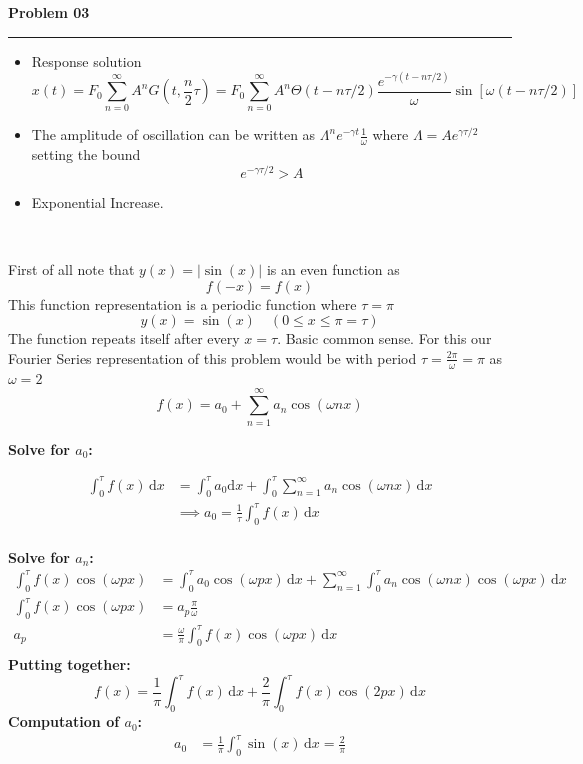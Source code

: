 \documentclass[letterpaper]{article}
\begin{document}
\vspace{0.4cm}
\textbf{Problem 03} \\
\noindent\rule{\textwidth}{0.2pt} 
\begin{itemize} 
	\item Response solution \[
 x(t) = F_0 \sum_{n=0}^{\infty} A^{n} G\left(t, \frac{n}{2} \tau\right)  
=  F_0 \sum_{n=0}^{\infty} 
A^{n}
\Theta(t - n \tau / 2 ) 
\frac{e^{- \gamma (t- n \tau / 2)}}{\omega}  
\sin\left[\omega (t- n \tau / 2 )\right]
\] 
\item The amplitude of oscillation can be written as $\Lambda^{n} e^{- \gamma t} \frac{1}{\omega}$ where $\Lambda = A e^{\gamma \tau / 2}$ setting the bound 
	\[
	e^{- \gamma \tau / 2} > A 
	\] 
\item Exponential Increase. 
\end{itemize}
\newpage
\ 

{}
\vspace{0.7cm} 

First of all note that $y(x) = | \sin(x) | $ is an even function as
\[
f(-x) = f(x)
\] This function representation is a periodic function where $\tau = \pi$
\[
y(x) = \sin(x) \quad (0 \le x \le \pi = \tau)
\]
The function repeats itself after every $x = \tau$. Basic common sense. 
For this our Fourier Series representation of this problem would be with period $\tau = \frac{2\pi}{\omega } = \pi$ as $\omega = 2$
\[
f(x) = a_0 + \sum_{n=1}^{\infty} a_n \cos(\omega n x) 
\]

\textbf{Solve for $a_0$: } 

\begin{align*} 
	\int_{0}^{\tau}  
	f(x) \, \mathrm{d} x &= \int_{0}^{\tau}   a_0 \mathrm{d} x + \int_{0}^{\tau}  \sum_{n=1}^{\infty} a_n \cos(\omega n x) \, \mathrm{d} x \\ 
	&\implies
a_0 = \frac{1}{\tau} \int_{0}^{\tau} f(x) \, \mathrm{d} x 
	\\
\end{align*}

\textbf{Solve for $a_n$:}
\begin{align*}
	\int_{0}^{\tau} f(x) \cos(\omega p x) &= 
\int_{0}^{\tau}  a_0 \cos(\omega p x) \, \mathrm{d}  x + \sum_{n=1}^{\infty} 
\int_{0}^{\tau} a_n  \cos(\omega n x) \cos(\omega p x) \, \mathrm{d}  x
	\\  
\int_{0}^{\tau} f(x) \cos( \omega p x) &=
a_p \frac{\pi}{\omega} \tag{2nd term is zero for $n \neq p$} 
\\ 
a_p &= \frac{\omega}{\pi } \int_{0}^{\tau} f(x) \cos(\omega p x)   \, \mathrm{d} x\\
\end{align*}
\textbf{Putting together:} 
\[
f(x) = \frac{1}{\pi} \int_{0}^{\tau} f(x) \, \mathrm{d} x + 
\frac{2}{\pi } \int_{0}^{\tau} f(x) \cos(2 px)  \, \mathrm{d} x
\]
\textbf{Computation of $a_0$: }
\begin{align*} a_0 &= \frac{1}{ \pi }
	\int_{0}^{\tau} \sin(x) \, \mathrm{d} x = \frac{2}{\pi }
\end{align*}
\end{document}
